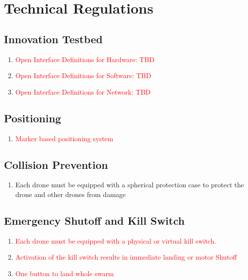 
\newpage
\section{Technical Regulations}

\subsection{Innovation Testbed}
\begin{enumerate}
	\item{\textcolor{red}{Open Interface Definitions for Hardware: TBD}}
	\item{\textcolor{red}{Open Interface Definitions for Software: TBD}}
	\item{\textcolor{red}{Open Interface Definitions for Network: TBD}}
\end{enumerate}

\subsection{Positioning}
\begin{enumerate}
	\item{\textcolor{red}{Marker based positioning system}}

\end{enumerate}

\subsection{Collision Prevention}
\begin{enumerate}
	\item{Each drone must be equipped with a spherical protection case to protect the drone and other drones from damage}
\end{enumerate}

\subsection{Emergency Shutoff and Kill Switch}
\begin{enumerate}
	\item{\textcolor{red}{Each drone must be equipped with a physical or virtual kill switch.}}
	\item{\textcolor{red}{Activation of the kill switch results in immediate landing or motor Shutoff}}
	\item{\textcolor{red}{One button to land whole swarm}}
\end{enumerate}

